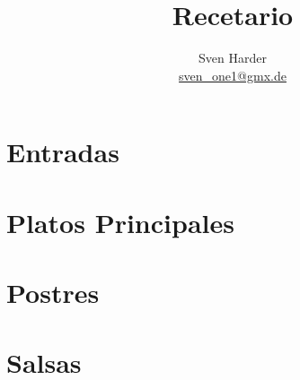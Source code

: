 \documentclass[%
a4paper,
11pt
]{article}
\begin{document}
\title{Recetario}
\author{Sven Harder\\ \href{mailto:sven\_one1@gmx.de}{sven\_one1@gmx.de}}


\tableofcontents

\vspace{5em}

\section{Entradas}



\section{Platos Principales}


%









\section{Postres}




\section{Salsas}





\end{document}

